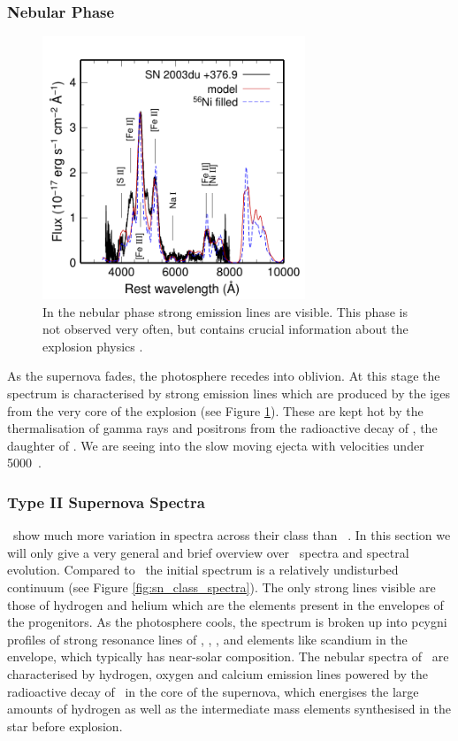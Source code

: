 \subsubsection{Nebular Phase}
\begin{figure}[tb] %
\centering
   \includegraphics[width=0.7\textwidth]{chapter_intro/plots/2003du_p377.pdf}
   \caption[Nebular phase spectrum of SN 2003du]{In the nebular phase strong emission lines are visible. This phase is not observed very often, but contains crucial information about the explosion physics \citep[Figure kindly provided by M. Tanaka;][]{2011MNRAS.410.1725T}.}
   \label{fig:sn2003du_nebular}
\end{figure}
As the supernova fades, the photosphere recedes into oblivion. At this stage the spectrum is characterised by strong emission lines which are produced by the \glspl{ige} from the very core of the explosion (see Figure \ref{fig:sn2003du_nebular}). These are kept hot by the thermalisation of gamma rays and positrons from the radioactive decay of \Co, the daughter of \Ni. We are seeing into the slow moving ejecta with velocities under 5000~\kms. 




\subsubsection{Type II Supernova Spectra}
\sneii\ show much more variation in spectra across their class than \sneia\ . In this section we will only give a very general and brief overview over \sneii\ spectra and spectral evolution. 
Compared to \sneia\ the initial spectrum is a relatively undisturbed continuum (see Figure \ref{fig:sn_class_spectra}). The only strong lines visible are those of hydrogen and helium which are the elements present in the envelopes of the progenitors. 
As the photosphere cools, the spectrum is broken up into \gls{pcygni} profiles of strong resonance lines of , , , and elements like scandium in the envelope, which typically has near-solar composition. The nebular spectra of \sneii\ are characterised by hydrogen, oxygen and calcium emission lines powered by the radioactive decay of \Ni\ in the core of the supernova, which energises the large amounts of hydrogen as well as the intermediate mass elements synthesised in the star before explosion.

